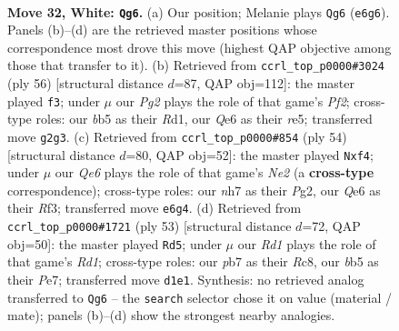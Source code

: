 \documentclass[11pt]{article}
\begin{document}
\clearpage

\begin{figure}[p]\centering
\begin{subfigure}{0.46\textwidth}\centering
\resizebox{\linewidth}{!}{%
\newchessgame
\chessboard[
  setfen={4r3/kp2p1bn/1r1pQ3/1b4p1/3PP3/1PR2P2/6PP/1K1R4 w - - 8 32},
  showmover=false,
  pgfstyle=straightmove, color=movearrow, markmove={e6-g6}
]}
\caption{}
\end{subfigure}\hfill
\begin{subfigure}{0.46\textwidth}\centering
\resizebox{\linewidth}{!}{%
\newchessgame
\chessboard[
  setfen={4r1k1/1q3p1p/6p1/2p1r3/1pQ1P3/1P5P/5PP1/3RR1K1 w - - 2 29},
  showmover=false,
  pgfstyle=straightmove, color=movearrow, markmove={f2-f3}
]}
\caption{}
\end{subfigure}
\\[4pt]
\begin{subfigure}{0.46\textwidth}\centering
\resizebox{\linewidth}{!}{%
\newchessgame
\chessboard[
  setfen={2r1r1k1/4qp1p/3p3b/2pP4/4Pp2/1P3R1P/2Q1N1P1/4R2K w - - 2 28},
  showmover=false,
  pgfstyle=straightmove, color=movearrow, markmove={e2-f4}
]}
\caption{}
\end{subfigure}\hfill
\begin{subfigure}{0.46\textwidth}\centering
\resizebox{\linewidth}{!}{%
\newchessgame
\chessboard[
  setfen={2rr2k1/p3p2p/4P1p1/1qp5/7P/1Pp1BN2/P1P3P1/1K3R1R b - - 2 27},
  showmover=false,
  pgfstyle=straightmove, color=movearrow, markmove={d8-d5}
]}
\caption{}
\end{subfigure}
\caption{\textbf{Move 32, White: \texttt{Qg6}.} (a) Our position; Melanie plays \texttt{Qg6} (\texttt{e6g6}). Panels (b)--(d) are the retrieved master positions whose correspondence most drove this move (highest QAP objective among those that transfer to it). (b) Retrieved from \texttt{ccrl\_top\_p0000\#3024} (ply 56) [structural distance $d$=87, QAP obj=112]: the master played \texttt{f3}; under $\mu$ our \emph{Pg2} plays the role of that game's \emph{Pf2}; cross-type roles: our \emph{b}b5 as their \emph{R}d1, our \emph{Q}e6 as their \emph{r}e5; transferred move \texttt{g2g3}. (c) Retrieved from \texttt{ccrl\_top\_p0000\#854} (ply 54) [structural distance $d$=80, QAP obj=52]: the master played \texttt{Nxf4}; under $\mu$ our \emph{Qe6} plays the role of that game's \emph{Ne2} (a \textbf{cross-type} correspondence); cross-type roles: our \emph{n}h7 as their \emph{P}g2, our \emph{Q}e6 as their \emph{R}f3; transferred move \texttt{e6g4}. (d) Retrieved from \texttt{ccrl\_top\_p0000\#1721} (ply 53) [structural distance $d$=72, QAP obj=50]: the master played \texttt{Rd5}; under $\mu$ our \emph{Rd1} plays the role of that game's \emph{Rd1}; cross-type roles: our \emph{p}b7 as their \emph{R}c8, our \emph{b}b5 as their \emph{P}e7; transferred move \texttt{d1e1}. Synthesis: no retrieved analog transferred to \texttt{Qg6} -- the \texttt{search} selector chose it on value (material / mate); panels (b)--(d) show the strongest nearby analogies.}
\label{fig:thought-m62}
\end{figure}
\end{document}

